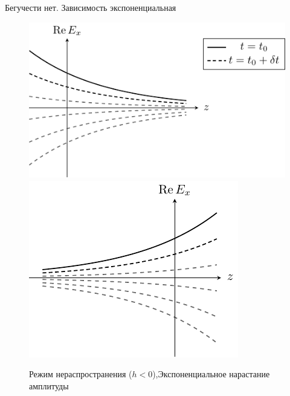\documentclass[a4paper,14pt]{extarticle}
\begin{document}
Бегучести нет.
Зависимость экспоненциальная
\begin{figure}[h!]
	\centering
	\includegraphics[scale=1]{img/lect3_ris2}
	\includegraphics[scale=1]{img/lect3_ris3}
	\caption{Режим нераспространения ($h<0$),Экспоненциальное нарастание амплитуды}
	\label{fig:lect3:2}
\end{figure}
\end{document}
